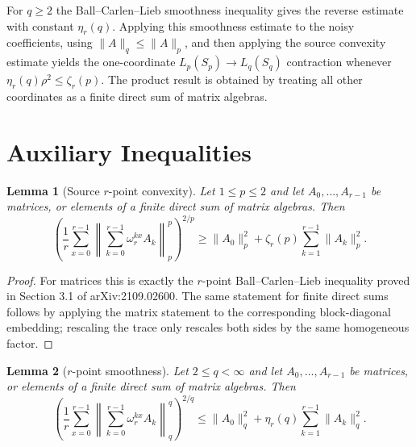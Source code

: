 \documentclass[11pt]{article}
\newtheorem{lemma}{Lemma}
\begin{document}
For $q\geq2$ the Ball--Carlen--Lieb smoothness inequality gives the reverse
estimate with constant $\eta_r(q)$. Applying this smoothness estimate to the
noisy coefficients, using $\|A\|_q\leq\|A\|_p$, and then applying the source
convexity estimate yields the one-coordinate $L_p(S_p)\to L_q(S_q)$
contraction whenever $\eta_r(q)\rho^2\leq\zeta_r(p)$. The product result is
obtained by treating all other coordinates as a finite direct sum of matrix
algebras.

\section*{Auxiliary Inequalities}

\begin{lemma}[Source $r$-point convexity]
\label{lem:convexity}
Let $1\leq p\leq2$ and let $A_0,\ldots,A_{r-1}$ be matrices, or elements of
a finite direct sum of matrix algebras. Then
\[
  \left(
  \frac1r\sum_{x=0}^{r-1}
  \left\|\sum_{k=0}^{r-1}\omega_r^{kx}A_k\right\|_p^p
  \right)^{2/p}
  \geq
  \|A_0\|_p^2+\zeta_r(p)\sum_{k=1}^{r-1}\|A_k\|_p^2 .
\]
\end{lemma}

\begin{proof}
For matrices this is exactly the $r$-point Ball--Carlen--Lieb inequality
proved in Section 3.1 of arXiv:2109.02600. The same statement for finite
direct sums follows by applying the matrix statement to the corresponding
block-diagonal embedding; rescaling the trace only rescales both sides by the
same homogeneous factor.
\end{proof}

\begin{lemma}[$r$-point smoothness]
\label{lem:smoothness}
Let $2\leq q<\infty$ and let $A_0,\ldots,A_{r-1}$ be matrices, or elements of
a finite direct sum of matrix algebras. Then
\[
  \left(
  \frac1r\sum_{x=0}^{r-1}
  \left\|\sum_{k=0}^{r-1}\omega_r^{kx}A_k\right\|_q^q
  \right)^{2/q}
  \leq
  \|A_0\|_q^2+\eta_r(q)\sum_{k=1}^{r-1}\|A_k\|_q^2 .
\]
\end{lemma}
\end{document}
